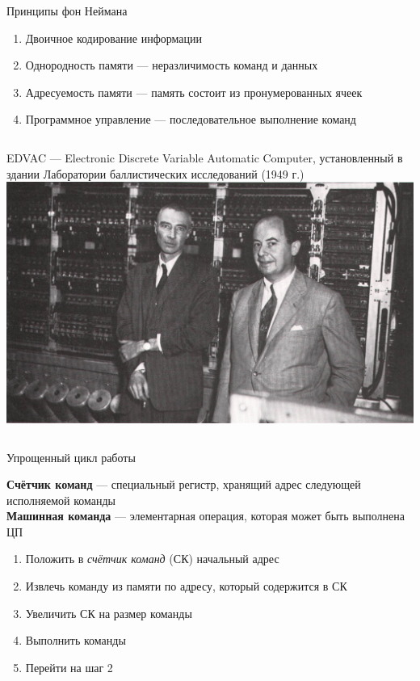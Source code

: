 \documentclass{beamer}
\begin{document}
    \begin{frame}{Принципы фон Неймана}
        \begin{enumerate}
            \item Двоичное кодирование информации
            \item Однородность памяти --- неразличимость команд и данных
            \item Адресуемость памяти --- память состоит из пронумерованных ячеек
            \item Программное управление --- последовательное выполнение команд
        \end{enumerate}
        \begin{columns}
            EDVAC --- Electronic Discrete Variable Automatic Computer, установленный в здании Лаборатории баллистических исследований (1949 г.)
            \includegraphics[width=1.0\linewidth]{fig/EDVAC.jpg}
        \end{columns}
    \end{frame}
    \begin{frame}{Упрощенный цикл работы}

        {\bf Счётчик команд} --- специальный регистр, хранящий адрес следующей исполняемой команды \\
        {\bf Машинная команда } --- элементарная операция, которая может быть выполнена ЦП
        \bigskip
        \begin{enumerate}
            \item Положить в {\it счётчик команд} (СК) начальный адрес 
            \item Извлечь команду из памяти по адресу, который содержится в СК
            \item Увеличить СК на размер команды
            \item Выполнить команды
            \item Перейти на шаг 2
        \end{enumerate}
    \end{frame}
\end{document}
